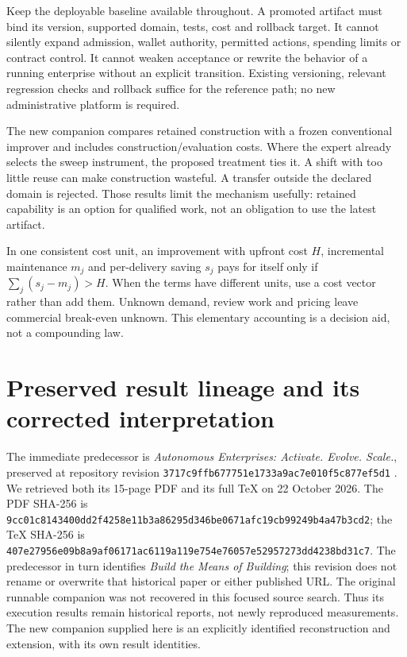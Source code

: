 \documentclass[11pt,letterpaper]{article}
\begin{document}
Keep the deployable baseline available throughout. A promoted artifact must bind its version, supported domain, tests, cost and rollback target. It cannot silently expand admission, wallet authority, permitted actions, spending limits or contract control. It cannot weaken acceptance or rewrite the behavior of a running enterprise without an explicit transition. Existing versioning, relevant regression checks and rollback suffice for the reference path; no new administrative platform is required.

The new companion compares retained construction with a frozen conventional improver and includes construction/evaluation costs. Where the expert already selects the sweep instrument, the proposed treatment ties it. A shift with too little reuse can make construction wasteful. A transfer outside the declared domain is rejected. Those results limit the mechanism usefully: retained capability is an option for qualified work, not an obligation to use the latest artifact.

In one consistent cost unit, an improvement with upfront cost $H$, incremental maintenance $m_j$ and per-delivery saving $s_j$ pays for itself only if $\sum_j(s_j-m_j)>H$. When the terms have different units, use a cost vector rather than add them. Unknown demand, review work and pricing leave commercial break-even unknown. This elementary accounting is a decision aid, not a compounding law.

\section{Preserved result lineage and its corrected interpretation}
\label{sec:predecessor}
The immediate predecessor is \emph{Autonomous Enterprises: Activate. Evolve. Scale.}, preserved at repository revision \nolinkurl{3717c9ffb677751e1733a9ac7e010f5c877ef5d1} \cite{predecessor20261022}. We retrieved both its 15-page PDF and its full TeX on 22 October 2026. The PDF SHA-256 is \nolinkurl{9cc01c8143400dd2f4258e11b3a86295d346be0671afc19cb99249b4a47b3cd2}; the TeX SHA-256 is \nolinkurl{407e27956e09b8a9af06171ac6119a119e754e76057e52957273dd4238bd31c7}. The predecessor in turn identifies \emph{Build the Means of Building}; this revision does not rename or overwrite that historical paper or either published URL. The original runnable companion was not recovered in this focused source search. Thus its execution results remain historical reports, not newly reproduced measurements. The new companion supplied here is an explicitly identified reconstruction and extension, with its own result identities.
\end{document}
